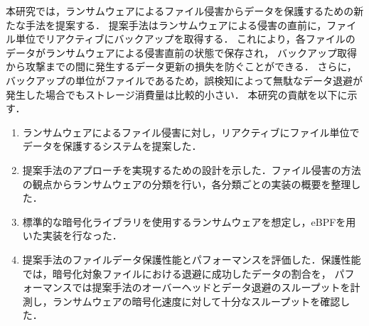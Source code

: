 本研究では，ランサムウェアによるファイル侵害からデータを保護するための新たな手法を提案する．
提案手法はランサムウェアによる侵害の直前に，ファイル単位でリアクティブにバックアップを取得する．
これにより，各ファイルのデータがランサムウェアによる侵害直前の状態で保存され，
バックアップ取得から攻撃までの間に発生するデータ更新の損失を防ぐことができる．
さらに，バックアップの単位がファイルであるため，誤検知によって無駄なデータ退避が発生した場合でもストレージ消費量は比較的小さい．
本研究の貢献を以下に示す．
\begin{enumerate}
  \item ランサムウェアによるファイル侵害に対し，リアクティブにファイル単位でデータを保護するシステムを提案した．

  \item 提案手法のアプローチを実現するための設計を示した．ファイル侵害の方法の観点からランサムウェアの分類を行い，各分類ごとの実装の概要を整理した．

  \item 標準的な暗号化ライブラリを使用するランサムウェアを想定し，eBPFを用いた実装を行なった．

  \item 提案手法のファイルデータ保護性能とパフォーマンスを評価した．保護性能では，暗号化対象ファイルにおける退避に成功したデータの割合を，
        パフォーマンスでは提案手法のオーバーヘッドとデータ退避のスループットを計測し，ランサムウェアの暗号化速度に対して十分なスループットを確認した．
\end{enumerate}
